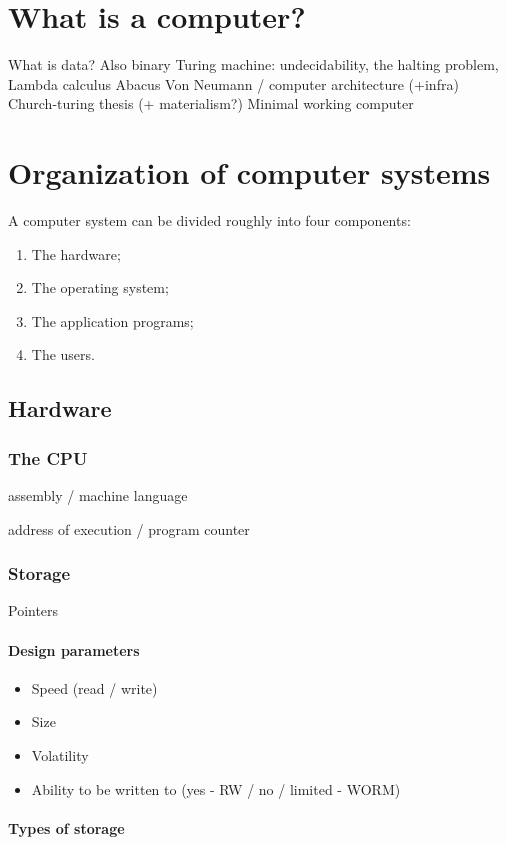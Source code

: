 \chapter{What is a computer?}
What is data? Also binary
Turing machine: undecidability, the halting problem, 
Lambda calculus
Abacus
Von Neumann / computer architecture (+infra)
Church-turing thesis (+ materialism?)
Minimal working computer

\chapter{Organization of computer systems}
A computer system can be divided roughly into four components:
\begin{enumerate}
\item The hardware;
\item The operating system;
\item The application programs;
\item The users.
\end{enumerate}

\section{Hardware}
\subsection{The CPU}
assembly / machine language

address of execution / program counter

\subsection{Storage}
Pointers

\subsubsection{Design parameters}
\begin{itemize}
\item Speed (read / write)
\item Size
\item Volatility
\item Ability to be written to (yes - RW / no / limited - WORM)
\end{itemize}

\subsubsection{Types of storage}
